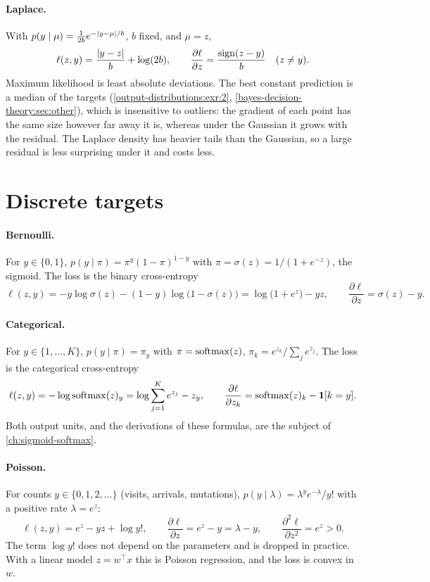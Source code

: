 \begin{notechapter}
\paragraph{Laplace.} With $p(y\mid\mu) = \frac1{2b}e^{-\left|y - \mu\right|/b}$, $b$ fixed, and $\mu = z$,
\[
  \ell(z, y) = \frac{\left|y - z\right|}b + \log(2b),\qquad
  \frac{\partial\ell}{\partial z} = \frac{\operatorname{sign}(z - y)}b\quad(z\neq y).
\]
Maximum likelihood is least absolute deviations. The best constant prediction
is a median of the targets (\cref{output-distributions:exr:2},
\cref{bayes-decision-theory:sec:other}), which is insensitive to outliers: the gradient
of each point has the same size however far away it is, whereas under the
Gaussian it grows with the residual. The Laplace density has heavier tails than
the Gaussian, so a large residual is less surprising under it and costs less.

\section{Discrete targets}\label{output-distributions:sec:discrete}

\paragraph{Bernoulli.} For $y\in\{0, 1\}$, $p(y\mid\pi) = \pi^y(1 - \pi)^{1-y}$ with
$\pi = \sigma(z) = 1/(1 + e^{-z})$, the sigmoid. The loss is the binary cross-entropy
\[
  \ell(z, y) = -y\log\sigma(z) - (1 - y)\log\bigl(1 - \sigma(z)\bigr) = \log\bigl(1 + e^{z}\bigr) - yz,\qquad
  \frac{\partial\ell}{\partial z} = \sigma(z) - y .
\]

\paragraph{Categorical.} For $y\in\{1,\dots,K\}$, $p(y\mid\pi) = \pi_y$ with
$\pi = \operatorname{softmax}(z)$, $\pi_k = e^{z_k}/\sum_je^{z_j}$. The loss is the categorical cross-entropy
\[
  \ell(z, y) = -\log\operatorname{softmax}(z)_y = \log\sum_{j=1}^Ke^{z_j} - z_y,\qquad
  \frac{\partial\ell}{\partial z_k} = \operatorname{softmax}(z)_k - \mathbf{1}[k = y].
\]
Both output units, and the derivations of these formulas, are the subject of
\cref{ch:sigmoid-softmax}.

\paragraph{Poisson.} For counts $y\in\{0, 1, 2, \dots\}$ (visits, arrivals, mutations),
$p(y\mid\lambda) = \lambda^ye^{-\lambda}/y!$ with a positive rate $\lambda = e^z$:
\[
  \ell(z, y) = e^z - yz + \log y!,\qquad
  \frac{\partial\ell}{\partial z} = e^z - y = \lambda - y,\qquad
  \frac{\partial^2\ell}{\partial z^2} = e^z>0 .
\]
The term $\log y!$ does not depend on the parameters and is dropped in practice.
With a linear model $z = w^\top x$ this is Poisson regression, and the loss is convex
in $w$.


\end{notechapter}
